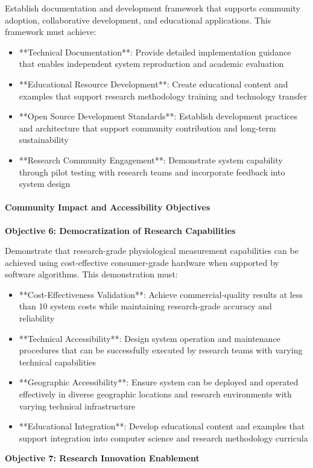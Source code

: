 \documentclass[11pt,a4paper]{article}
\begin{document}
Establish documentation and development framework that supports community adoption,
collaborative development, and
educational applications. This framework must achieve:

\begin{itemize}
\item **Technical Documentation**: Provide detailed implementation guidance that enables independent system
  reproduction and academic evaluation
\item **Educational Resource Development**: Create educational content and examples that support research methodology
  training and technology transfer
\item **Open Source Development Standards**: Establish development practices and architecture that support community
  contribution and long-term sustainability
\item **Research Community Engagement**: Demonstrate system capability through pilot testing with research teams and
  incorporate feedback into system design

\end{itemize}
\paragraph{Community Impact and Accessibility Objectives}

\textbf{Objective 6: Democratization of Research Capabilities}

Demonstrate that research-grade physiological measurement capabilities can be
achieved using cost-effective
consumer-grade hardware when supported by software algorithms.  This
demonstration must:

\begin{itemize}
\item **Cost-Effectiveness Validation**: Achieve commercial-quality results at less than 10%
  system costs while maintaining research-grade accuracy and reliability
\item **Technical Accessibility**: Design system operation and maintenance procedures that can be successfully executed by
  research teams with varying technical capabilities
\item **Geographic Accessibility**: Ensure system can be deployed and operated effectively in diverse geographic locations
  and research environments with varying technical infrastructure
\item **Educational Integration**: Develop educational content and examples that support integration into computer science
  and research methodology curricula

\end{itemize}
\textbf{Objective 7: Research Innovation Enablement}
\end{document}
